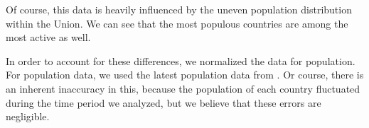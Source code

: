 \documentclass[lettersize,journal]{IEEEtran}
\begin{document}
Of course, this data is heavily influenced by the uneven population distribution within the Union. We can see that the most populous countries are among the most active as well.

In order to account for these differences, we normalized the data for population. For population data, we used the latest population data from \cite{citypopulation}. Or course, there is an inherent inaccuracy in this, because the population of each country fluctuated during the time period we analyzed, but we believe that these errors are negligible.

\end{document}
